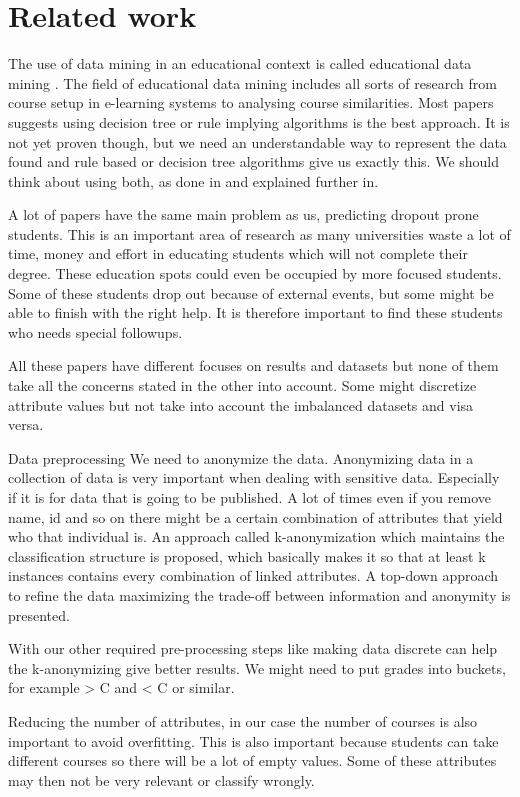 \section{Related work}
The use of data mining in an educational context is called educational data mining \cite{1}. The field of educational data mining includes all sorts of research from course setup in e-learning systems to analysing course similarities. Most papers suggests using decision tree\cite{2} or rule implying algorithms is the best approach. It is not yet proven though, but we need an understandable way to represent the data found and rule based or decision tree algorithms give us exactly this. We should think about using both, as done in\cite{3} and explained further in\cite{4}.

A lot of papers have the same main problem as us, predicting dropout prone students\cite{5,7,8,9,11}. This is an important area of research as many universities waste a lot of time, money and effort in educating students which will not complete their degree. These education spots could even be occupied by more focused students. Some of these students drop out because of external events, but some might be able to finish with the right help. It is therefore important to find these students who needs special followups. 

All these papers have different focuses on results and datasets but none of them take all the concerns stated in the other into account. Some might discretize attribute values but not take into account the imbalanced datasets and visa versa.

Data preprocessing
We need to anonymize the data. Anonymizing data in a collection of data is very important when dealing with sensitive data. Especially if it is for data that is going to be published. A lot of times even if you remove name, id and so on there might be a certain combination of attributes that yield who that individual is. An approach called k-anonymization which maintains the classification structure is proposed, which basically makes it so that at least k instances contains every combination of linked attributes. A top-down approach to refine the data maximizing the trade-off between information and anonymity is presented\cite{14}.

With our other required pre-processing steps like making data discrete can help the k-anonymizing give better results. We might need to put grades into buckets, for example > C and < C or similar\cite{12}. 

Reducing the number of attributes, in our case the number of courses is also important to avoid overfitting\cite{9}. This is also important because students can take different courses so there will be a lot of empty values. Some of these attributes may then not be very relevant or classify wrongly.

